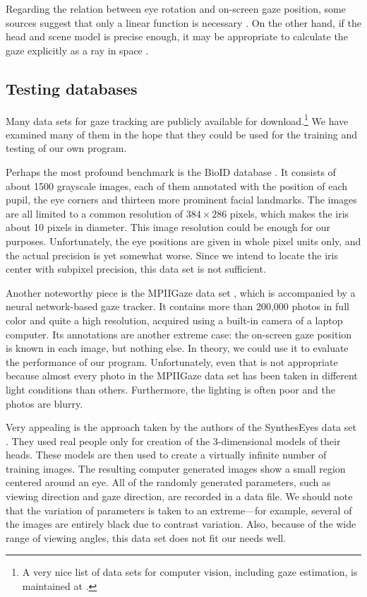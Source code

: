 Regarding the relation between eye rotation and on-screen gaze position, some sources suggest that only a linear function is necessary \cite{zhu12}.
On the other hand, if the head and scene model is precise enough, it may be appropriate to calculate the gaze explicitly as a ray in space \cite{wang16}.

\subsection{Testing databases}

Many data sets for gaze tracking are publicly available for download.\footnote{
A very nice list of data sets for computer vision, including gaze estimation, is maintained at .
}
We have examined many of them in the hope that they could be used for the training and testing of our own program.

Perhaps the most profound benchmark is the BioID database \cite{bioid}.
It consists of about 1500 grayscale images, each of them annotated with the position of each pupil, the eye corners and thirteen more prominent facial landmarks.
The images are all limited to a common resolution of $384\times286$ pixels, which makes the iris about 10 pixels in diameter.
This image resolution could be enough for our purposes.
Unfortunately, the eye positions are given in whole pixel units only, and the actual precision is yet somewhat worse.
Since we intend to locate the iris center with subpixel precision, this data set is not sufficient.

Another noteworthy piece is the MPIIGaze data set \cite{mpiigaze}, which is accompanied by a neural network-based gaze tracker.
It contains more than 200,000 photos in full color and quite a high resolution, acquired using a built-in camera of a laptop computer.
Its annotations are another extreme case: the on-screen gaze position is known in each image, but nothing else.
In theory, we could use it to evaluate the performance of our program.
Unfortunately, even that is not appropriate because almost every photo in the MPIIGaze data set has been taken in different light conditions than others.
Furthermore, the lighting is often poor and the photos are blurry.

Very appealing is the approach taken by the authors of the SynthesEyes data set \cite{syntheseyes}.
They used real people only for creation of the 3-dimensional models of their heads.
These models are then used to create a virtually infinite number of training images.
The resulting computer generated images show a small region centered around an eye.
All of the randomly generated parameters, such as viewing direction and gaze direction, are recorded in a data file.
We should note that the variation of parameters is taken to an extreme---for example, several of the images are entirely black due to contrast variation.
Also, because of the wide range of viewing angles, this data set does not fit our needs well.

